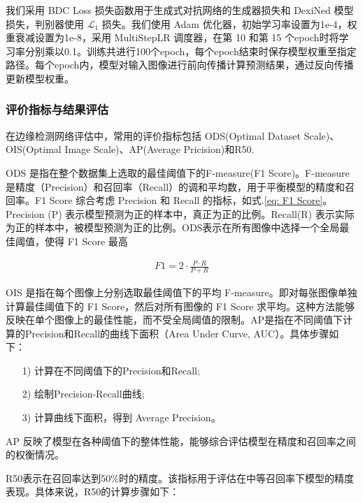 \documentclass[a4paper]{ctexart}
\begin{document}
	我们采用 BDC Loss 损失函数用于生成式对抗网络的生成器损失和 DexiNed 模型损失，判别器使用 $\mathcal{L}_1$ 损失。我们使用 Adam 优化器，初始学习率设置为1e-4，权重衰减设置为1e-8，采用 MultiStepLR 调度器，在第 10 和第 15 个epoch时将学习率分别乘以0.1。训练共进行100个epoch，每个epoch结束时保存模型权重至指定路径。每个epoch内，模型对输入图像进行前向传播计算预测结果，通过反向传播更新模型权重。
	
	\subsubsection{评价指标与结果评估}		
	
	在边缘检测网络评估中，常用的评价指标包括 ODS(Optimal Dataset Scale)、OIS(Optimal Image Scale)、AP(Average Pricision)和R50.
	
	ODS 是指在整个数据集上选取的最佳阈值下的F-measure(F1 Score)。F-measure是精度（Precision）和召回率（Recall）的调和平均数，用于平衡模型的精度和召回率。F1 Score 综合考虑 Precision 和 Recall 的指标，如式.\ref{eq: F1 Score}。Precision (P) 表示模型预测为正的样本中，真正为正的比例。Recall(R) 表示实际为正的样本中，被模型预测为正的比例。ODS表示在所有图像中选择一个全局最佳阈值，使得 F1 Score 最高
	
	\begin{equation}
		\begin{aligned}
			F1 = 2 \cdot \frac{P \cdot R}{P + R}
		\end{aligned}
		\label{eq: F1 Score}
	\end{equation}
	
	OIS 是指在每个图像上分别选取最佳阈值下的平均 F-measure。即对每张图像单独计算最佳阈值下的 F1 Score，然后对所有图像的 F1 Score 求平均。这种方法能够反映在单个图像上的最佳性能，而不受全局阈值的限制。AP是指在不同阈值下计算的Precision和Recall的曲线下面积（Area Under Curve, AUC）。具体步骤如下：
	
	\begin{itemize}
		\item[1)]
		计算在不同阈值下的Precision和Recall;
		\item[2)]
		绘制Precision-Recall曲线;
		\item[3)]
		计算曲线下面积，得到 Average Precision。
	\end{itemize}
	
	AP 反映了模型在各种阈值下的整体性能，能够综合评估模型在精度和召回率之间的权衡情况。
	
	R50表示在召回率达到50\%时的精度。该指标用于评估在中等召回率下模型的精度表现。具体来说，R50的计算步骤如下：
	
\end{document}
